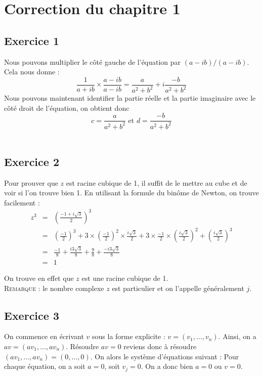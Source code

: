 \documentclass[12pt]{book}
\begin{document}
\section*{Correction du chapitre 1}

\subsection*{Exercice 1}
Nous pouvons multiplier le côté gauche de l'équation par $(a-ib)/(a-ib)$. Cela nous donne :
\begin{equation*}
    \frac{1}{a+ib}\times\frac{a-ib}{a-ib}=\frac{a}{a^2+b^2}+i\frac{-b}{a^2+b^2}
\end{equation*}
\indent
Nous pouvons maintenant identifier la partie réelle et la partie imaginaire avec le côté droit de l'équation, on obtient donc
\begin{equation*}
    c=\frac{a}{a^2+b^2} \textrm{~et~} d=\frac{-b}{a^2+b^2}
\end{equation*}\\

\subsection*{Exercice 2}
Pour prouver que $z$ est racine cubique de 1, il suffit de le mettre au cube et de voir si l'on trouve bien 1. En utilisant la formule du binôme de Newton, on trouve facilement :
\begin{eqnarray*}
z^3 & = & \left(\frac{-1+i\sqrt{3}}{2}\right)^3\\
    & = & \left(\frac{-1}{2}\right)^3+3\times\left(\frac{-1}{2}\right)^2\times\frac{i\sqrt{3}}{2}+3\times\frac{-1}{2}\times\left(\frac{i\sqrt{3}}{2}\right)^2+\left(\frac{i\sqrt{3}}{2}\right)^3\\
    & = & \frac{-1}{8}+\frac{i3\sqrt{3}}{8}+\frac{9}{8}+\frac{-i3\sqrt{3}}{8}\\
    & = & 1
\end{eqnarray*}

On trouve en effet que $z$ est une racine cubique de 1.\\
\textsc{Remarque :} le nombre complexe $z$ est particulier et on l'appelle généralement $j$.

\subsection*{Exercice 3}
On commence en écrivant $v$ sous la forme explicite : $v=(v_1,\ldots,v_n)$. Ainsi, on a $av=(av_1,\ldots,av_n)$. Résoudre $av=0$ reviens donc à résoudre $(av_1,\ldots,av_n)=(0,\ldots,0)$. On alors le système d'équations suivant :
Pour chaque équation, on a soit $a=0$, soit $v_j=0$. On a donc bien $a=0$ ou $v=0$.
\end{document}
